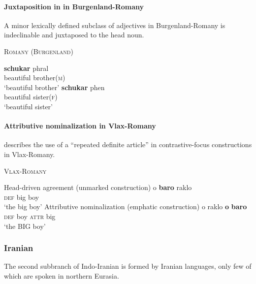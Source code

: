 \paragraph{Juxtaposition in in Burgenland-Romany}
A minor lexically defined subclass of adjectives in Burgenland-Romany is indeclinable and juxtaposed to the head noun.
\begin{exe}
\ex \textsc{Romany (Burgenland)} \citep[22–23]{halwachs-etal2002}
\begin{xlist}
\ex 
\gll	\textbf{schukar} phral\\
	beautiful brother(\textsc{m})\\
\glt	‘beautiful brother’
\ex
\gll	\textbf{schukar} phen\\
	beautiful sister(\textsc{f})\\
\glt	‘beautiful sister’
\end{xlist}
\end{exe}

\paragraph{Attributive nominalization in Vlax-Romany}
\citet{hancock1995} describes the use of a “repeated definite article” in contrastive-focus constructions in Vlax-Romany. 
\begin{exe}
\ex \textsc{Vlax-Romany} \citep[30]{hancock1995}
\begin{xlist}
\ex Head-driven agreement (unmarked construction)
\gll	o \textbf{baro} raklo\\
	\textsc{def}	big	boy\\
\glt ‘the big boy’
\ex Attributive nominalization (emphatic construction)
\gll	o raklo \textbf{o} \textbf{baro}\\
	\textsc{def}	{boy}	\textsc{attr} big\\
\glt	‘the BIG boy’
\end{xlist}
\end{exe}

\subsubsection{Iranian}\label{iranian synchr}
The second subbranch of Indo-Iranian is formed by Iranian languages, only few of which are spoken in northern Eurasia.\\

